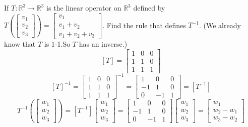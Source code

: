 \documentclass[12pt]{article}
\begin{document}
\begin{example} If $T: \mathbb{R}^3 \to \mathbb{R}^3$ is the linear operator on $\mathbb{R}^3$ defined by $T(\begin{bmatrix} v_1 \\ v_2 \\ v_3 \end{bmatrix}) = \begin{bmatrix} v_1 \\ v_1 + v_2 \\ v_1 + v_2 + v_3 \end{bmatrix}$. Find the rule that defines $T^{-1}$. (We already know that $T$ is 1-1.So $T$ has an inverse.)
$$[T] = \begin{bmatrix} 1 & 0 & 0 \\ 1 & 1 & 0 \\ 1 & 1 & 1 \end{bmatrix} $$ $$[T]^{-1} = \begin{bmatrix} 1 & 0 & 0 \\ 1 & 1 & 0 \\ 1 & 1 & 1 \end{bmatrix}^{-1} = \begin{bmatrix} 1 & 0 & 0 \\ -1 & 1 & 0 \\ 0 & -1 & 1 \end{bmatrix} = [T^{-1}] $$ $$T^{-1}(\begin{bmatrix} w_1 \\ w_2 \\ w_3 \end{bmatrix}) = [T^{-1}]\begin{bmatrix} w_1 \\ w_2 \\ w_3 \end{bmatrix} = \begin{bmatrix} 1 & 0 & 0 \\ -1 & 1 & 0 \\ 0 & -1 & 1 \end{bmatrix} \begin{bmatrix} w_1 \\ w_2 \\ w_3 \end{bmatrix} = \begin{bmatrix} w_1 \\ w_2 - w_1 \\ w_3 - w_2 \end{bmatrix} $$ \end{example} 
 
 
 
 
 
 
 
 
 
 
 
 
 
 
 
 
 
 
 
 
\end{document}
